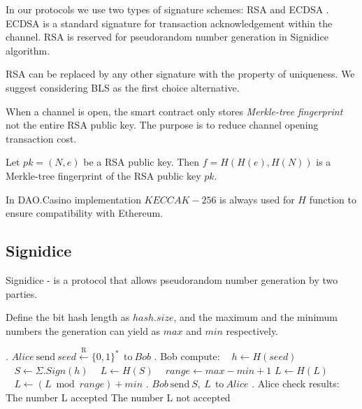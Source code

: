 In our protocols we use two types of signature schemes: RSA \cite{bib19} and ECDSA \cite{bib20}. ECDSA is a standard signature for transaction acknowledgement within the channel. RSA is reserved for pseudorandom number generation in Signidice algorithm.

\begin{remark}
RSA can be replaced by any other signature with the property of uniqueness. We suggest considering BLS \cite{bib10} as the first choice alternative.
\end{remark}

When a channel is open, the smart contract only stores \textit {Merkle-tree fingerprint} not the entire RSA public key. The purpose is to reduce channel opening transaction cost.

\begin{defn}
Let $pk = (N, e)$ be a RSA public key. Then $f = H(H(e), H(N))$ is a Merkle-tree fingerprint of the RSA public key $pk$. 
\end{defn}
\begin{remark}
In DAO.Casino implementation $KECCAK-256$ \cite{bib21} is always used for $H$ function to ensure compatibility with Ethereum. 
\end{remark}

	\subsection{Signidice}

Signidice \cite{bib18} - is a protocol that allows pseudorandom number generation by two parties. 

Define the bit hash length as $hash.size$, and the maximum and the minimum numbers the generation can yield as $max$ and $ min$ respectively.

\begin{algorithm} 
\caption*{$\textbf{Signidice}$} \label{alg:signidice}
\begin{algorithmic}
. $ Alice \ \text{send}\  seed\xleftarrow{\text{R}} \{0,1\}^* \  \ \text{to} \ Bob$
. Bob compute:
\State $\ \ \ \ h \gets H(seed)$
\State $\ \ \ \ S \gets  \Sigma . Sign(h)$
\State $\ \ \ \ L \gets H(S) $
\State $\ \ \ \ range \gets max - min +1$
\State$ L \gets H(L)$
\EndWhile
\State $ \ \ \ \  L \gets (L \bmod range) + min $
. $Bob \ \text{send}\  S, \ L \ \   \text{to} \ Alice$
. Alice check results:
\State The number L accepted
\Else 
\State The number L not accepted
\EndIf
\end{algorithmic}
\end{algorithm}

